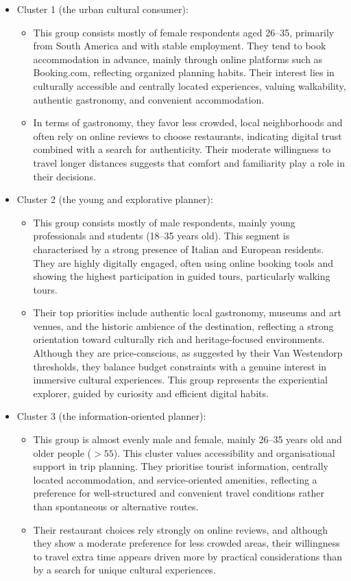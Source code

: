 \documentclass[a4paper, 12pt, twoside]{report}  %
\begin{document}
\begin{itemize}
    \item Cluster 1 (the urban cultural consumer):
    \begin{itemize}
        \item This group consists mostly of female respondents aged 26–35, primarily from South America and with stable employment. They tend to book accommodation in advance, mainly through online platforms such as Booking.com, reflecting organized planning habits. Their interest lies in culturally accessible and centrally located experiences, valuing walkability, authentic gastronomy, and convenient accommodation.
        \item In terms of gastronomy, they favor less crowded, local neighborhoods and often rely on online reviews to choose restaurants, indicating digital trust combined with a search for authenticity. Their moderate willingness to travel longer distances suggests that comfort and familiarity play a role in their decisions.
    \end{itemize}

    \item Cluster 2 (the young and explorative planner):
    \begin{itemize}
        \item This group consists mostly of male respondents, mainly young professionals and students (18–35 years old). This segment is characterised by a strong presence of Italian and European residents. They are highly digitally engaged, often using online booking tools and showing the highest participation in guided tours, particularly walking tours.
        \item Their top priorities include authentic local gastronomy, museums and art venues, and the historic ambience of the destination, reflecting a strong orientation toward culturally rich and heritage-focused environments. Although they are price-conscious, as suggested by their Van Westendorp thresholds, they balance budget constraints with a genuine interest in immersive cultural experiences. This group represents the experiential explorer, guided by curiosity and efficient digital habits.
    \end{itemize}

    \item Cluster 3 (the information-oriented planner):
    \begin{itemize}
        \item This group is almost evenly male and female, mainly 26–35 years old and older people ($>55$). This cluster values accessibility and organisational support in trip planning. They prioritise tourist information, centrally located accommodation, and service-oriented amenities, reflecting a preference for well-structured and convenient travel conditions rather than spontaneous or alternative routes.
        \item Their restaurant choices rely strongly on online reviews, and although they show a moderate preference for less crowded areas, their willingness to travel extra time appears driven more by practical considerations than by a search for unique cultural experiences.
    \end{itemize}


\end{itemize}
\end{document}
